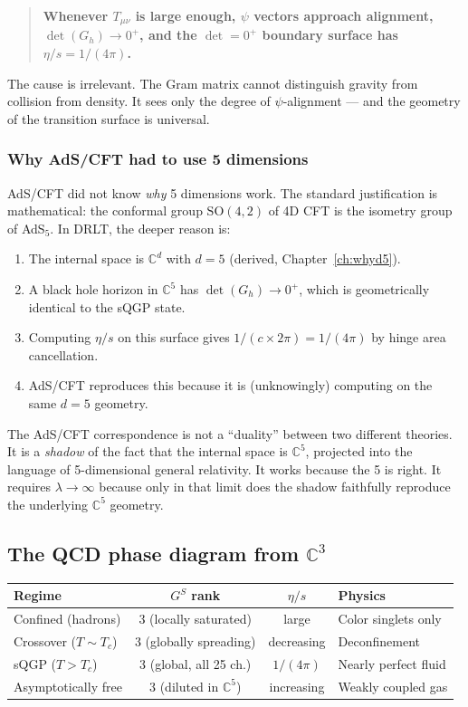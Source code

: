 \documentclass[12pt]{article}
\theoremstyle{remark}
\theoremstyle{definition}
\begin{document}
\begin{quote}
\textbf{Whenever $T_{\mu\nu}$ is large enough, $\psi$ vectors approach alignment, $\det(G_h) \to 0^+$, and the $\det = 0^+$ boundary surface has $\eta/s = 1/(4\pi)$.}
\end{quote}

The cause is irrelevant. The Gram matrix cannot distinguish gravity from collision from density. It sees only the degree of $\psi$-alignment --- and the geometry of the transition surface is universal.

\subsubsection{Why AdS/CFT had to use 5 dimensions}

AdS/CFT did not know \emph{why} 5 dimensions work. The standard justification is mathematical: the conformal group $\text{SO}(4,2)$ of 4D CFT is the isometry group of AdS$_5$. In DRLT, the deeper reason is:

\begin{enumerate}
\item The internal space is $\mathbb{C}^d$ with $d = 5$ (derived, Chapter~\ref{ch:whyd5}).
\item A black hole horizon in $\mathbb{C}^5$ has $\det(G_h) \to 0^+$, which is geometrically identical to the sQGP state.
\item Computing $\eta/s$ on this surface gives $1/(c \times 2\pi) = 1/(4\pi)$ by hinge area cancellation.
\item AdS/CFT reproduces this because it is (unknowingly) computing on the same $d = 5$ geometry.
\end{enumerate}

The AdS/CFT correspondence is not a ``duality'' between two different theories. It is a \emph{shadow} of the fact that the internal space is $\mathbb{C}^5$, projected into the language of 5-dimensional general relativity. It works because the 5 is right. It requires $\lambda \to \infty$ because only in that limit does the shadow faithfully reproduce the underlying $\mathbb{C}^5$ geometry.

\subsection{The QCD phase diagram from $\mathbb{C}^3$}

\begin{center}
\begin{tabular}{lccl}
\hline
Regime & $G^S$ rank & $\eta/s$ & Physics \\
\hline
Confined (hadrons) & 3 (locally saturated) & large & Color singlets only \\
Crossover ($T \sim T_c$) & 3 (globally spreading) & decreasing & Deconfinement \\
sQGP ($T > T_c$) & 3 (global, all 25 ch.) & $1/(4\pi)$ & Nearly perfect fluid \\
Asymptotically free & 3 (diluted in $\mathbb{C}^5$) & increasing & Weakly coupled gas \\
\hline
\end{tabular}
\end{center}
\end{document}
